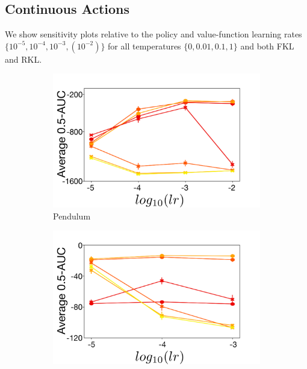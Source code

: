 \documentclass{article}
\begin{document}
\subsection{Continuous Actions}

We show sensitivity plots relative to the policy and value-function learning rates $\{10^{-5}, 10^{-4}, 10^{-3}, (10^{-2})\}$ for all temperatures $\{0, 0.01, 0.1, 1\}$ and both FKL and RKL.

\begin{figure}[!ht]
  \centering
  \begin{subfigure}[b]{0.3\linewidth}
    \centering
    \includegraphics[width=\columnwidth]{figs/deep/continuous/PD_pi_ss.pdf} 
    \caption{Pendulum
    }\label{fig:pendulum-pi}
  \end{subfigure}%
  \begin{subfigure}[b]{0.3\linewidth}
    \centering
    \includegraphics[width=\columnwidth]{figs/deep/continuous/Reacher_pi_ss.pdf} 

\end{subfigure}
\end{figure}
\end{document}
